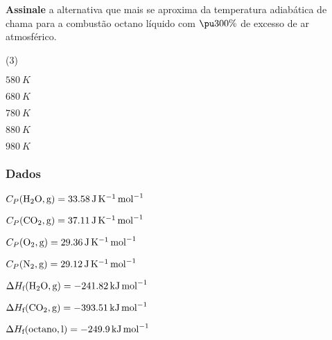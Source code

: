 \documentclass[braun, twocolumn]{braun}
\begin{document}
\begin{problem}
[2A39]\textbf{Assinale} a alternativa que mais se aproxima da temperatura
adiabática de chama para a combustão octano líquido com \(\pu{300\%}\)
de excesso de ar atmosférico.


\begin{choices}
(3)
\item \(\qty{580}{K}\)

\item \(\qty{680}{K}\)

\item \(\qty{780}{K}\)

\item \(\qty{880}{K}\)

\item \(\qty{980}{K}\)

\end{choices}
\subsubsection*{Dados}


\begin{datalist}

\item $C_P(\ce{H2O, {g}}) = \qty{33,58}{J.K^{-1}.mol^{-1}}$
\item $C_P(\ce{CO2, {g}}) = \qty{37,11}{J.K^{-1}.mol^{-1}}$
\item $C_P(\ce{O2, {g}}) = \qty{29,36}{J.K^{-1}.mol^{-1}}$
\item $C_P(\ce{N2, {g}}) = \qty{29,12}{J.K^{-1}.mol^{-1}}$
\item $\Delta H_\text{f}(\ce{H2O, {g}}) = \qty{-241,82}{kJ.mol^{-1}}$
\item $\Delta H_\text{f}(\ce{CO2, {g}}) = \qty{-393,51}{kJ.mol^{-1}}$
\item $\Delta H_\text{f}(\ce{octano, {l}}) = \qty{-249,9}{kJ.mol^{-1}}$
\end{datalist}

\end{problem}
\end{document}
